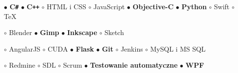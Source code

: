 \documentclass[11pt,a4paper]{article}
\begin{document}
    \smallskip
    $\bullet$ {\bf C\texttt{\#}}
    \hspace{0.34cm}
    $\bullet$ {\bf C\texttt{++}}
    \hspace{0.34cm}
    $\circ$ HTML i CSS
    \hspace{0.34cm}
    $\circ$ JavaScript
    \hspace{0.34cm}
    $\bullet$ {\bf Objective-C}
    \hspace{0.34cm}
    $\bullet$ {\bf Python}
    \hspace{0.34cm}
    $\circ$ Swift
    \hspace{0.34cm}
    $\circ$ TeX


    \smallskip


    \smallskip
    $\circ$ Blender
    \hspace{0.34cm}
    $\bullet$ {\bf Gimp}
    \hspace{0.34cm}
    $\bullet$ {\bf Inkscape}
    \hspace{0.34cm}
    $\circ$ Sketch


    \smallskip


    \smallskip
    $\circ$ AngularJS
    \hspace{0.34cm}
    $\circ$ CUDA
    \hspace{0.34cm}
    $\bullet$ {\bf Flask}
    \hspace{0.34cm}
    $\bullet$ {\bf Git}
    \hspace{0.34cm}
    $\circ$ Jenkins
    \hspace{0.34cm}
    $\circ$ MySQL i MS SQL

    \vspace{0.04cm}
    $\circ$ Redmine
    \hspace{0.34cm}
    $\circ$ SDL
    \hspace{0.34cm}
    $\circ$ Scrum
    \hspace{0.34cm}
    $\bullet$ {\bf Testowanie automatyczne}
    \hspace{0.34cm}
    $\bullet$ {\bf WPF}
  
\end{document}
